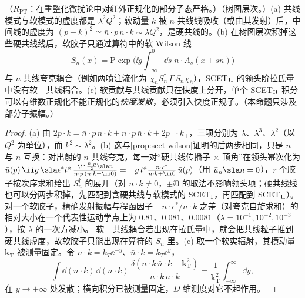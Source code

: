 \begin{proposition}\label{prop:scet-scet2}
（$R_{\mathrm{PT}}$：在重整化微扰论中对红外正规化的部分子态严格。）（树图层次。）(a) 共线模式与软模式的虚度都是 $\lambda^2Q^2$；软动量 $k$ 被 $n$ 共线线吸收（或由其发射）后，中间线的虚度为 $(p+k)^2\simeq\bar n\cdot p\,n\cdot k\sim\lambda Q^2$，是硬共线的。(b) 在树图层次积掉这些硬共线线后，软胶子只通过算符中的软 Wilson 线
\begin{equation}\label{eq:scet-Sn}
S_n(x)=\mathrm P\exp\Big(\ii g\int_{-\infty}^0\dd s\;n\cdot A_s(x+sn)\Big)
\end{equation}
与 $n$ 共线夸克耦合（例如两喷注流化为 $\bar\chi_nS_n^\dagger\,\Gamma\,S_{\bar n}\chi_{\bar n}$），SCET$_{\rm II}$ 的领头阶拉氏量中没有软—共线耦合\cite{BauerEtAl2002,Hill:2002vw}。(c) 软贡献与共线贡献只在快度上分开，单个 SCET$_{\rm II}$ 积分可以有维数正规化不能正规化的\emph{快度发散}，必须引入快度正规子\cite[第~3、4~节]{ChiuEtAl2012b}。（本命题只涉及部分子振幅。）
\end{proposition}

\begin{proof}
(a) 由 $2p\cdot k=\bar n\cdot p\,n\cdot k+n\cdot p\,\bar n\cdot k+2p_\perp\cdot k_\perp$，三项分别为 $\lambda$、$\lambda^3$、$\lambda^2$（以 $Q^2$ 为单位），而 $k^2\sim\lambda^2$。(b) 这与\cref{prop:scet-wilson}证明的后两步相同，只是 $n$ 与 $\bar n$ 互换：对出射的 $n$ 共线夸克，每一对“硬共线传播子 × 顶角”在领头幂次化为 $\bar u(p)\,\ii g\,\sla\epsilon^*t^a\,\frac{\ii\frac{\bar n\cdot p}{2}\sla n}{\bar n\cdot p\,(n\cdot k+\ii0)}=-g\,t^a\frac{n\cdot\epsilon^*}{n\cdot k+\ii0}\,\bar u(p)$（用 $\bar u_n\sla n=0$），$r$ 个胶子按次序求和给出 $S_n^\dagger$ 的展开（对 $n\cdot k\neq0$，$\pm\ii0$ 的取法不影响领头项；硬共线线也可以分两步积掉，先匹配到含硬共线与软模式的 SCET$_{\rm I}$，再匹配到 SCET$_{\rm II}$\cite{BauerEtAl2002,Hill:2002vw}）。对一个软胶子，精确发射振幅与程函因子 $-n\cdot\epsilon^*/n\cdot k$ 之差（对夸克自旋求和）的相对大小在一个代表性运动学点上为 $0.81$、$0.081$、$0.0081$（$\lambda=10^{-1},10^{-2},10^{-3}$），按 $\lambda$ 的一次方减小。%
软—共线耦合若出现在拉氏量中，就会把共线粒子推到硬共线虚度，故软胶子只能出现在算符的 $S_n$ 里。(c) 取一个软实辐射，其横动量 $\bm k_{\mathrm T}$ 被测量固定。令 $n\cdot k=k_T\ee^{-y}$、$\bar n\cdot k=k_T\ee^{y}$，
\begin{equation}\label{eq:scet-rapdiv}
\int\dd(n\cdot k)\,\dd(\bar n\cdot k)\,\frac{\delta(n\cdot k\,\bar n\cdot k-\bm k_{\mathrm T}^2)}{n\cdot k\,\bar n\cdot k}=\frac{1}{\bm k_{\mathrm T}^2}\int_{-\infty}^{\infty}\dd y ,
\end{equation}
在 $y\to\pm\infty$ 处发散；横向积分已被测量固定，$D$ 维测度对它不起作用。
\end{proof}


